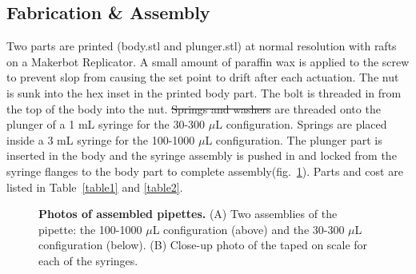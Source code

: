 \documentclass[10pt,letterpaper]{article}
\providecommand{\DIFaddtex}[1]{{\protect\color{blue}\uwave{#1}}} %
\providecommand{\DIFdeltex}[1]{{\protect\color{red}\sout{#1}}}                      %
\providecommand{\DIFaddbegin}{} %
\providecommand{\DIFaddend}{} %
\providecommand{\DIFdelbegin}{} %
\providecommand{\DIFdelend}{} %
\providecommand{\DIFadd}[1]{\texorpdfstring{\DIFaddtex{#1}}{#1}} %
\providecommand{\DIFdel}[1]{\texorpdfstring{\DIFdeltex{#1}}{}} %
\begin{document}
\subsection*{Fabrication \& Assembly}
Two parts are printed (body.stl and plunger.stl) at normal resolution with rafts on a Makerbot Replicator.
A small amount of paraffin wax is applied to the screw to prevent slop from causing the set point to drift after each actuation.
The nut is sunk into the hex inset in the printed body part.
The bolt is threaded in from the top of the body into the nut.
\DIFdelbegin \DIFdel{Springs and washers }\DIFdelend \DIFaddbegin \DIFadd{Two springs }\DIFaddend are threaded onto the plunger of a 1 mL syringe for the 30-300 $\mu$L configuration.
Springs are placed inside a 3 mL syringe for the 100-1000 $\mu$L configuration.
The plunger part is inserted in the body and the syringe assembly is pushed in and locked from the syringe flanges to the body part to complete assembly(fig.~\ref{fig3}\DIFaddbegin \DIFadd{, }\DIFaddend ).
Parts and cost are listed in Table~\ref{table1} and \ref{table2}.

\begin{figure}
	\caption{
		{\bf Photos of assembled pipettes.}  (A) Two assemblies of the pipette: the 100-1000 $\mu$L configuration (above) and the 30-300 $\mu$L configuration (below). (B) Close-up photo of the taped on scale for each of the syringes. 
	}
	\label{fig3}
\end{figure}
\end{document}
